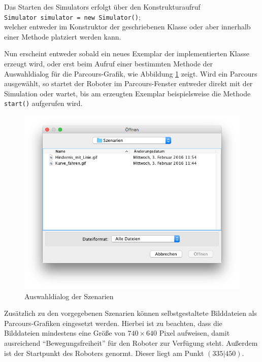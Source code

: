 \documentclass[paper=a4, DIV=calc, BCOR=12mm, twoside=on, onecolumn=on, open = right, titlepage =on, parskip =half-, headsepline = on, footsepline = off, chapterprefix = off, appendixprefix = on, fontsize = 12pt, numbers = noenddot, abstract = on]{scrbook}
\begin{document}

Das Starten des Simulators erfolgt über den Konstrukturaufruf\\
\hspace*{2ex} \texttt{Simulator simulator = new Simulator()};\\
welcher entweder im Konstruktor der geschriebenen Klasse oder aber innerhalb einer Methode platziert werden kann.

Nun erscheint entweder sobald ein neues Exemplar der implementierten Klasse erzeugt wird, oder erst beim Aufruf einer bestimmten Methode der Auswahldialog für die Parcours-Grafik, wie Abbildung \ref{fig:auswahl_szenarien} zeigt. Wird ein Parcours ausgewählt, so startet der Roboter im Parcours-Fenster entweder direkt mit der Simulation oder wartet, bis am erzeugten Exemplar beispielsweise die Methode \texttt{start()} aufgerufen wird.

\begin{figure}[htbp]
\centering
\includegraphics[width=\textwidth]{images/dialog_szenarien.png}
\caption{Auswahldialog der Szenarien}
\label{fig:auswahl_szenarien}
\end{figure}


Zusätzlich zu den vorgegebenen Szenarien können selbstgestaltete Bilddateien als Parcours-Grafiken eingesetzt werden. Hierbei ist zu beachten, dass die Bilddateien mindestens eine Größe von $740 \times 640$ Pixel aufweisen, damit ausreichend "`Bewegungsfreiheit"' für den Roboter zur Verfügung steht. Außerdem ist der Startpunkt des Roboters genormt. Dieser liegt am Punkt $\left( 335 \vert 450 \right)$.
\end{document}
